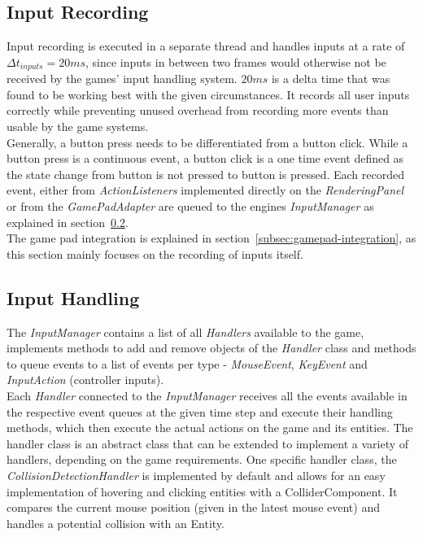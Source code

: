 \subsection{Input Recording}\label{subsec:input-recording}
Input recording is executed in a separate thread and handles inputs at a rate of $\Delta t_{inputs} = 20 ms$, since inputs in between two frames
would otherwise not be received by the games' input handling system.
$20 ms$ is a delta time that was found to be working best with the given circumstances.
It records all user inputs correctly while preventing unused overhead from recording more events than usable by the game systems.
\\
Generally, a button press needs to be differentiated from a button click.
While a button press is a continuous event, a button click is a one time event defined as the state change from button is not pressed to button is pressed.
Each recorded event, either from \textit{ActionListeners} implemented directly on the \textit{RenderingPanel} or from
the \textit{GamePadAdapter} are queued to the engines \textit{InputManager} as explained in section~\ref{subsec:input-handling}.
\\
The game pad integration is explained in section~\ref{subsec:gamepad-integration}, as this section mainly focuses on the recording of inputs itself.
\subsection{Input Handling}\label{subsec:input-handling}
The \textit{InputManager} contains a list of all \textit{Handlers} available to the game, implements methods to add and remove objects
of the \textit{Handler} class and methods to queue events
to a list of events per type - \textit{MouseEvent}, \textit{KeyEvent} and \textit{InputAction} (controller inputs).
\\
Each \textit{Handler} connected to the \textit{InputManager} receives all the events available in the respective event
queues at the given time step and execute their handling methods, which
then execute the actual actions on the game and its entities.
The handler class is an abstract class that can be extended to implement a variety of handlers, depending on the game requirements.
One specific handler class, the \textit{CollisionDetectionHandler} is implemented by default and allows for an easy implementation of hovering and clicking entities with a ColliderComponent.
It compares the current mouse position (given in the latest mouse event) and handles a potential collision with an Entity.

